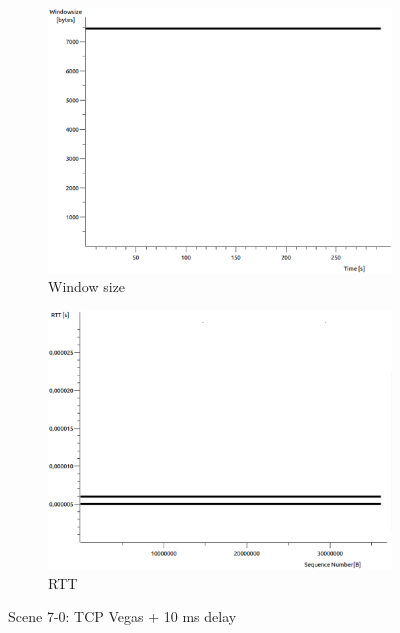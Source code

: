 \documentclass[conference,a4paper]{IEEEtran}
\begin{document}
\begin{figure}
\begin{subfigure}[b]{0.2\textwidth}
  \includegraphics[width=\textwidth]{s7-0_wsize}
  \caption{Window size}
 \end{subfigure}
 \begin{subfigure}[b]{0.2\textwidth}
  \includegraphics[width=\textwidth]{s7-0_rtt}
  \caption{RTT}
 \end{subfigure}
 \caption{Scene 7-0: TCP Vegas + 10 ms delay}
\end{figure}
\end{document}
